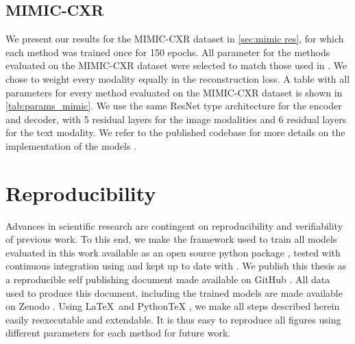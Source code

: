 
\subsection{MIMIC-CXR}
We present our results for the MIMIC-CXR dataset in \cref{sec:mimic res}, for which each method was trained once for 150 epochs.
All parameter for the methods evaluated on the MIMIC-CXR dataset were selected to match those used in \citep{klug_multimodal_nodate}.
We chose to weight every modality equally in the reconstruction loss.
A table with all parameters for every method evaluated on the MIMIC-CXR dataset is shown in \cref{tab:params_mimic}.
We use the same ResNet \citep{he2016deep} type architecture for the encoder and decoder, with 5 residual layers for the image modalities and 6 residual layers for the text modality.
We refer to the published codebase for more details on the implementation of the models \citep{mmvae_github}.




\section{Reproducibility}
Advances in scientific research are contingent on reproducibility and verifiability of previous work.
To this end, we make the framework used to train all models evaluated in this work available as an open source python package \citep{mmvae_github}, tested with continuous integration using \citep{travis} and kept up to date with \citep{dependabot}.
We publish this thesis as a reproducible self publishing document \citep[\href{https://github.com/TheChymera/RepSeP}{RepSeP}]{repsep} made available on GitHub \citep{mmnf_repsep}.
All data used to produce this document, including the trained models are made available on Zenodo \citep{mmnfdataset}.
Using \LaTeX\ and PythonTeX \citep{pytex}, we make all steps described herein easily reexecutable and extendable.
It is thus easy to reproduce all figures using different parameters for each method for future work.
